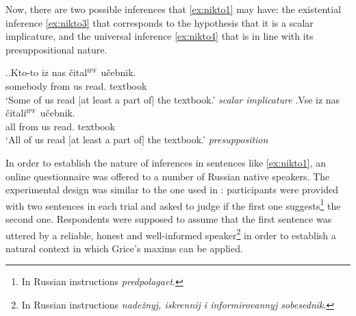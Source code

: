 Now, there are two possible inferences that \ref{ex:nikto1} may have: the existential inference \ref{ex:nikto3} that corresponds to the hypothesis that it is a scalar implicature, and the universal inference \ref{ex:nikto4} that is in line with its presuppositional nature.

\ex.\ag.\label{ex:nikto3}Kto-to iz nas \v{c}ital$^{\textsc{ipf}}$ u\v{c}ebnik.\\
somebody from us read. textbook\\
`Some of us read $[$at least a part of$]$ the textbook.' \hfill \textit{scalar implicature}
\bg.\label{ex:nikto4}Vse iz nas \v{c}itali$^{\textsc{ipf}}$ u\v{c}ebnik.\\
all from us read. textbook\\
`All of us read $[$at least a part of$]$ the textbook.' \hfill \textit{presupposition}

In order to establish the nature of inferences in sentences like \ref{ex:nikto1}, an online questionnaire was offered to a number of Russian native speakers. The experimental design was similar to the one used in \citealt{Chemla:09}: participants were provided with two sentences in each trial and asked to judge if the first one suggests\footnote{In Russian instructions \textit{predpolagaet}.} the second one. Respondents were supposed to assume that the first sentence was uttered by a reliable, honest and well-informed speaker\footnote{In Russian instructions \textit{nade\v{z}nyj, iskrennij i informirovannyj sobesednik}.} in order to establish a natural context   in which Grice's maxims can be applied.

